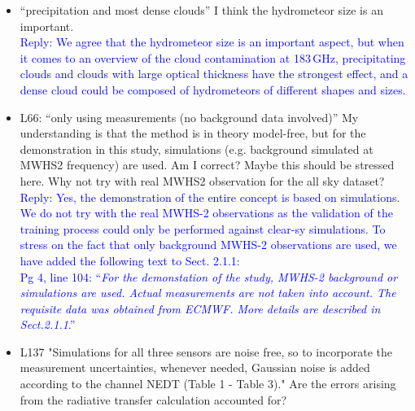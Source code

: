 \documentclass[11pt,a4paper,draft]{article}
\begin{document}
\begin{itemize}

\item 	``precipitation and most dense clouds'' I think the hydrometeor size is an important.\\
		
		
\textcolor{blue}{Reply: We agree that the hydrometeor size is an important aspect, but when it comes to an overview of the cloud contamination at 183\,GHz, precipitating clouds and clouds with large optical thickness have the strongest effect, and a dense cloud could be composed of hydrometeors of different shapes and sizes. }\\
		
		
\item	L66: ``only using measurements (no background data involved)'' My understanding is
		that the method is in theory model-free, but for the demonstration in this study, simulations (e.g. background simulated at MWHS2 frequency) are used. Am I correct?
		Maybe this should be stressed here. Why not try with real MWHS2 observation for the
		all sky dataset?\\
		
\textcolor{blue}{Reply: Yes, the demonstration of the entire concept is based on simulations. We do not try with the real MWHS-2 observations as the validation of the training process could only be performed against clear-sy simulations. To stress on the fact that only background MWHS-2 observations are used, we have added the following text to Sect. 2.1.1:\\
Pg 4, line 104:
``\textit{For the demonstation of the study, MWHS-2 background or simulations are used. Actual measurements are not taken into account. The requisite data was obtained from ECMWF. More details are described in Sect.2.1.1}.''} \\
		
		
\item
		L137 "Simulations for all three sensors are noise free, so to incorporate the measurement uncertainties, whenever needed, Gaussian noise is added according to the channel NEDT (Table 1 - Table 3)." Are the errors arising from the radiative transfer calculation accounted for?\\
		

\end{itemize}
\end{document}
